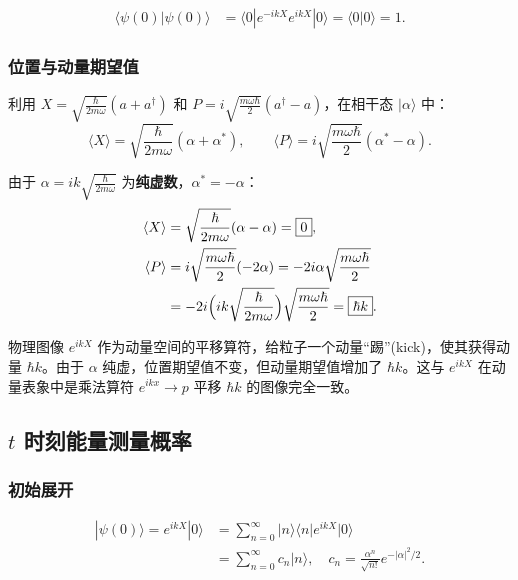\begin{align*}
  \langle\psi(0)|\psi(0)\rangle
  &= \langle 0|e^{-ikX}e^{ikX}|0\rangle = \langle 0|0\rangle = 1.
\end{align*}

\subsubsection{位置与动量期望值}

利用 $X = \sqrt{\frac{\hbar}{2m\omega}}(a+a^\dagger)$ 和 $P = i\sqrt{\frac{m\omega\hbar}{2}}(a^\dagger-a)$，在相干态 $|\alpha\rangle$ 中：
\[
  \langle X\rangle = \sqrt{\frac{\hbar}{2m\omega}}(\alpha+\alpha^*), \qquad
  \langle P\rangle = i\sqrt{\frac{m\omega\hbar}{2}}(\alpha^*-\alpha).
\]

由于 $\alpha = ik\sqrt{\frac{\hbar}{2m\omega}}$ 为\textbf{纯虚数}，$\alpha^*=-\alpha$：
\begin{align*}
  \langle X\rangle &= \sqrt{\frac{\hbar}{2m\omega}}(\alpha-\alpha) = \boxed{0}, \\
  \langle P\rangle &= i\sqrt{\frac{m\omega\hbar}{2}}(-2\alpha)
   = -2i\alpha\sqrt{\frac{m\omega\hbar}{2}} \\
  &= -2i\Bigl(ik\sqrt{\frac{\hbar}{2m\omega}}\Bigr)\sqrt{\frac{m\omega\hbar}{2}}
   = \boxed{\hbar k}.
\end{align*}

\begin{insightbox}{物理图像}
$e^{ikX}$ 作为动量空间的平移算符，给粒子一个动量``踢''(kick)，使其获得动量 $\hbar k$。由于 $\alpha$ 纯虚，位置期望值不变，但动量期望值增加了 $\hbar k$。这与 $e^{ikX}$ 在动量表象中是乘法算符 $e^{ikx} \to p$ 平移 $\hbar k$ 的图像完全一致。
\end{insightbox}


\subsection{$t$ 时刻能量测量概率}

\subsubsection{初始展开}

\begin{align*}
  |\psi(0)\rangle = e^{ikX}|0\rangle
  &= \sum_{n=0}^{\infty} |n\rangle\langle n|e^{ikX}|0\rangle \\
  &= \sum_{n=0}^{\infty} c_n |n\rangle,
  \quad c_n = \frac{\alpha^n}{\sqrt{n!}}e^{-|\alpha|^2/2}.
\end{align*}

